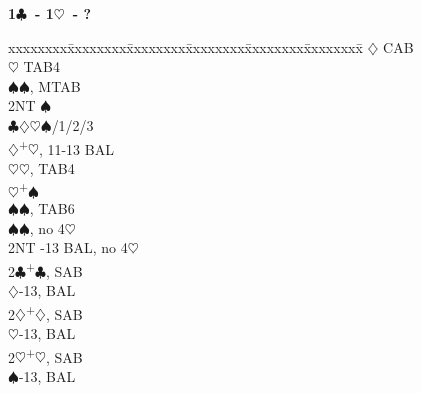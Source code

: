 \documentclass[10pt]{article}
\renewcommand{\c}{$\clubsuit$}
\renewcommand{\d}{$\diamondsuit$}
\newcommand{\h}{$\heartsuit$}
\newcommand{\s}{$\spadesuit$}
\newcommand{\p}{\textsuperscript{+}}
\newenvironment{bidtable}[1][]
{\textbf{#1}
  \begin{adjustwidth}{1em}{}
    \addvspace{2pt}
    \begin{tabbing}
      xxxxxxxx\=xxxxxxxx\=xxxxxxxx\=xxxxxxxx\=xxxxxxxx\=xxxxxxxx\=\kill}
{\end{tabbing}\end{adjustwidth}\bigskip}%
\begin{document}
\begin{multicols*}{2}
\begin{bidtable}[1\c\ - 1\h\ - ?]
    \>     \d  \> CAB                           \\
    \>     \h  \> TAB4                          \\
    \>     \s  {}\s, MTAB                     \\
    \>     \>      \> 2NT       \s              \\
    \>     \>      \c\d\h\s {}/1/2/3          \\
    \d {}\p\h, 11-13 BAL                      \\
    \>     \h  {}\h, TAB4                     \\
    \h {}\p\s                                 \\
    \>     \s  {}\s, TAB6                     \\
    \s {}\s, no 4\h                           \\
    \> 2NT -13 BAL, no 4\h                     \\
2\c {}\p\c, SAB                                   \\
    \d {}-13, BAL                            \\
2\d {}\p\d, SAB                                   \\
    \h {}-13, BAL                            \\
2\h {}\p\h, SAB                                   \\
    \s {}-13, BAL
\end{bidtable}


\end{multicols*}
\end{document}
